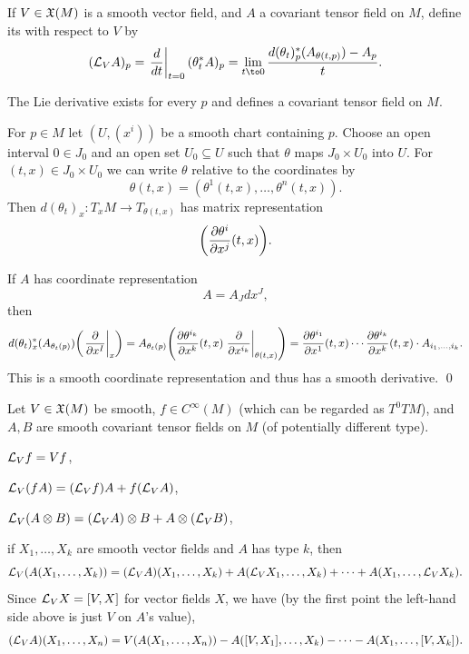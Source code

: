 \bdefn

    If $V\in{\frak X}(M)$ is a smooth vector field, and $A$ a covariant tensor field on $M$, define its  with respect to $V$
    by
    $$ (\L_VA)_p = \evdrv t_{t=0}(\theta_t^*A)_p = \lim_{t\to0}\frac{d(\theta_t)^*_p(A_{\theta(t,p)}) - A_p}t . $$

\edefn

\blemm

    The Lie derivative exists for every $p$ and defines a covariant tensor field on $M$.

\elemm

\bproof

    For $p\in M$ let $(U,(x^i))$ be a smooth chart containing $p$.
    Choose an open interval $0\in J_0$ and an open set $U_0\subseteq U$ such that $\theta$ maps $J_0\times U_0$ into $U$.
    For $(t,x)\in J_0\times U_0$ we can write $\theta$ relative to the coordinates by
    $$ \theta(t,x) = (\theta^1(t,x),\dots,\theta^n(t,x)) . $$
    Then $d(\theta_t)_x\colon T_xM\to T_{\theta(t,x)}$ has matrix representation
    $$ \mathopen{}\mathclose{\left({{\partial \theta^i}\over{\partial x^j}}(t,x)\right)} . $$

    If $A$ has coordinate representation
    $$ A = A_Jdx^J , $$
    then
    $$ d(\theta_t)^*_x(A_{\theta_t(p)})\mathopen{}\mathclose{\left(\left.{{\partial }\over{\partial x^I}}\right|_x\right)} =
    A_{\theta_t(p)}\mathopen{}\mathclose{\left({{\partial \theta^{i_k}}\over{\partial x^k}}(t,x)\left.{{\partial }\over{\partial x^{i_k}}}\right|_{\theta(t,x)}\right)} =
    {{\partial \theta^{i_1}}\over{\partial x^1}}(t,x)\cdots{{\partial \theta^{i_k}}\over{\partial x^k}}(t,x)\cdot A_{i_1,\dots,i_k} . $$
    This is a smooth coordinate representation and thus has a smooth derivative.
    \qed

\eproof

\bprop

    Let $V\in{\frak X}(M)$ be smooth, $f\in C^\infty(M)$ (which can be regarded as $T^0TM$), and $A,B$ are smooth covariant tensor fields on $M$
    (of potentially different type).
    \benum
        \item ${{\cal L}}_Vf=Vf$,
        \item ${{\cal L}}_V(fA)=({{\cal L}}_Vf)A+f({{\cal L}}_VA)$,
        \item ${{\cal L}}_V(A\otimes B)=({{\cal L}}_VA)\otimes B+A\otimes({{\cal L}}_VB)$,
        \item if $X_1,\dots,X_k$ are smooth vector fields and $A$ has type $k$, then
        $$ {{\cal L}}_V(A(X_1,\dots,X_k)) = ({{\cal L}}_VA)(X_1,\dots,X_k) + A({{\cal L}}_VX_1,\dots,X_k) + \cdots + A(X_1,\dots,{{\cal L}}_VX_k) . $$
        Since ${{\cal L}}_VX=[V,X]$ for vector fields $X$, we have (by the first point the left-hand side above is just $V$ on $A$'s value),
        $$ ({{\cal L}}_VA)(X_1,\dots,X_n) = V(A(X_1,\dots,X_n)) - A([V,X_1],\dots,X_k) - \cdots - A(X_1,\dots,[V,X_k]) . $$
    \eenum


